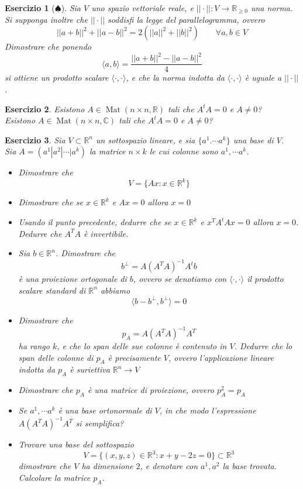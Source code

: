\documentclass{article}
\newtheorem{es}{Esercizio}
\begin{document}
{\begin{es}[$\spadesuit$]
    Sia $V$ uno spazio vettoriale reale, e $||\cdot||:V\to \mathbb{R}_{\geq 0}$ una norma. Si supponga inoltre che $||\cdot||$ soddisfi la legge del parallelogramma, ovvero
    $$||a+b||^2+||a-b||^2=2(||a||^2+||b||^2)\qquad \forall a,b\in V$$
    Dimostrare che ponendo $$\langle a,b\rangle=\frac{||a+b||^2-||a-b||^2}{4}$$
    si ottiene un prodotto scalare $\langle \cdot, \cdot \rangle$, e che la norma indotta da $\langle \cdot, \cdot \rangle$ è uguale a $||\cdot||$.
\end{es}


\begin{es}
    Esistono $A\in \operatorname{Mat}(n\times n,\mathbb{R})$ tali che $A^t A=0$ e $A\neq 0$?\\
    Esistono $A\in \operatorname{Mat}(n\times n,\mathbb{C})$ tali che $A^t A=0$ e $A\neq 0$?
\end{es}


\begin{es}
Sia $V\subset \mathbb{R}^n$ un sottospazio lineare, e sia $\{a^1.\cdots a^k\}$ una base di $V$.\\
Sia $A=(a^1|a^2|\cdots |a^k)$ la matrice $n\times k$ le cui colonne sono $a^1,\cdots a^k$.
\begin{itemize}
    \item Dimostrare che $$V=\{A x: x\in \mathbb{R}^k\}$$
    \item Dimostrare che se $x\in \mathbb{R}^k$ e  $Ax=0$ allora $x=0$
    \item Usando il punto precedente, dedurre che se $x\in \mathbb{R}^k$ e $x^T A^t A x=0$ allora $x=0$. Dedurre che $A^T A$ è invertibile.
    \item Sia $b\in \mathbb{R}^n$. Dimostrare che $$b^\perp=A(A^TA)^{-1} A^t b$$ è una proiezione ortogonale di $b$, ovvero se denotiamo con $\langle \cdot,\cdot\rangle$ il prodotto scalare standard di $\mathbb{R}^n$ abbiamo $$\langle b-b^\perp,b^\perp\rangle=0$$
    \item Dimostrare che $$p_A=A(A^TA)^{-1}A^T$$ ha rango $k$, e che lo span delle sue colonne è contenuto in $V$. Dedurre che lo span delle colonne di $p_A$ è precisamente $V$, ovvero l'applicazione lineare indotta da $p_A$ è suriettiva $\mathbb{R}^n\to V$
    \item Dimostrare che $p_A$ è una matrice di proiezione, ovvero $p_A^2=p_A$
    \item Se $a^1,\cdots a^k$ è una base ortonormale di $V$, in che modo l'espressione $A(A^T A)^{-1} A^T$ si semplifica?
    \item Trovare una base del sottospazio
    $$V=\{(x,y,z)\in\mathbb{R}^3:x+y-2z=0\}\subset \mathbb{R}^3$$
    dimostrare che $V$ ha dimensione $2$, e denotare con $a^1,a^2$ la base trovata.\\
    Calcolare la matrice $p_A$.
\end{itemize}


\end{es}}
\end{document}
